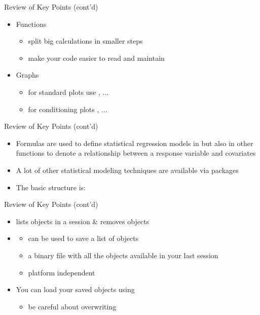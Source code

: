 \documentclass[14pt, aspectratio=169, sectionpage=simple, xclolor=table]{beamer}
\begin{document}
\begin{frame}{Review of Key Points (cont'd)}
\begin{itemize}
\item Functions
\begin{itemize}
\item split big calculations in smaller steps
\item make your code easier to read and maintain
\nl
\end{itemize}
\item Graphs
\begin{itemize}
\item for standard plots use , $\ldots$
\item for conditioning plots , $\ldots$
\end{itemize}
\end{itemize}
\end{frame}
\begin{frame}[fragile]{Review of Key Points (cont'd)}
\begin{itemize}
	\item Formulas are used to define statistical regression models in \R but also in
	other functions to denote a relationship between a response variable and covariates
	\nl
	\item A lot of other statistical modeling techniques are available via \R packages
	\nl
	\item The basic structure is:\\\hspace{2cm}
\end{itemize}
\end{frame}
\begin{frame}{Review of Key Points (cont'd)}
\begin{itemize}
\item {} lists \R objects in a session \&  removes objects
\nl
\item {}
\begin{itemize}
	\item can be used to save a list of \R objects
	\item a binary file with all the objects available in your last \R session
	\item platform independent
	\nl
\end{itemize}
\item You can load your saved \R objects using 
\begin{itemize}
	\item be careful about overwriting
\end{itemize}
\end{itemize}
\end{frame}
\end{document}
